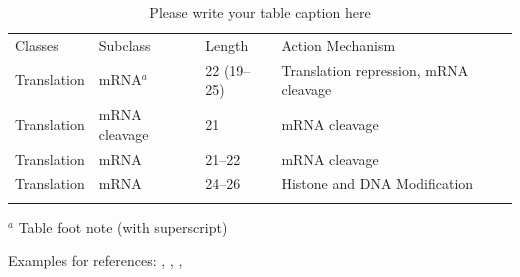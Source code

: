 \documentclass[graybox,envcountchap,sectrefs]{svmono}
\begin{document}
%
\begin{table}
	\caption{Please write your table caption here}
	\label{tab:A1}       %
	\begin{tabular}{p{2cm}p{2.4cm}p{2cm}p{4.9cm}}
		\hline\noalign{\smallskip}
		Classes & Subclass & Length & Action Mechanism  \\
		\noalign{\smallskip}\hline\noalign{\smallskip}
		Translation & mRNA$^a$  & 22 (19--25) & Translation repression, mRNA cleavage\\
		Translation & mRNA cleavage & 21 & mRNA cleavage\\
		Translation & mRNA  & 21--22 & mRNA cleavage\\
		Translation & mRNA  & 24--26 & Histone and DNA Modification\\
		\noalign{\smallskip}\hline\noalign{\smallskip}
	\end{tabular}
	$^a$ Table foot note (with superscript)
\end{table}
%

Examples for references: \cite{PlatypOUsGIT}, \cite{angeles2002fundamentals}, \cite{householder1964theory}, \cite{RozsaPalMatrix}

\newpage


	
\end{document}
